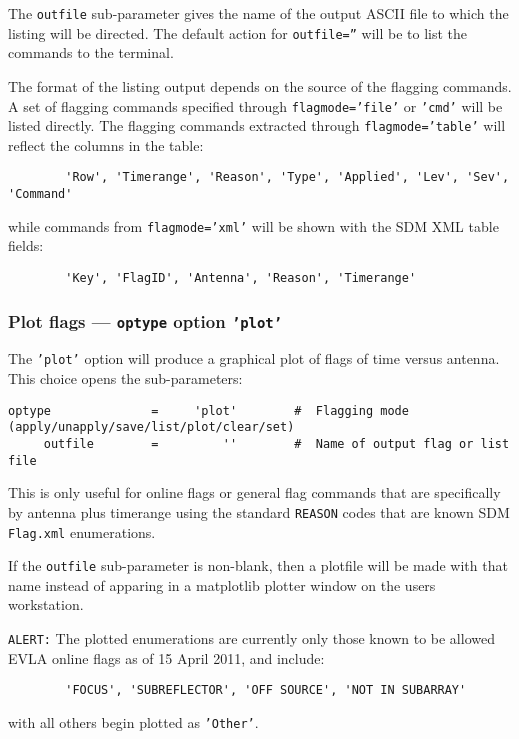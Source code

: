 The {\tt outfile} sub-parameter gives the name of the output ASCII
file to which the listing will be directed.  The default action for
{\tt outfile=''} will be to list the commands to the terminal.

The format of the listing output depends on the source of the flagging
commands. A set of flagging commands specified through 
{\tt flagmode='file'} or {\tt 'cmd'} will be listed directly. The
flagging commands extracted through {\tt flagmode='table'} will
reflect the columns in the table:
\begin{verbatim}
        'Row', 'Timerange', 'Reason', 'Type', 'Applied', 'Lev', 'Sev', 'Command'
\end{verbatim}
while commands from {\tt flagmode='xml'} will be shown with the SDM
XML table fields:
\begin{verbatim}
        'Key', 'FlagID', 'Antenna', 'Reason', 'Timerange'
\end{verbatim}

\subsubsection{Plot flags --- {\tt optype} option {\tt 'plot'}}
\label{section:edit.flagcmd.optype.plot}

The {\tt 'plot'} option will produce a graphical plot of flags of time versus antenna.
This choice opens the sub-parameters:
\small
\begin{verbatim}
optype              =     'plot'        #  Flagging mode (apply/unapply/save/list/plot/clear/set)
     outfile        =         ''        #  Name of output flag or list file
\end{verbatim}
\normalsize
This is only useful for online flags or general flag commands that are
specifically by antenna plus timerange using the standard {\tt REASON}
codes that are known SDM {\tt Flag.xml} enumerations.

If the {\tt outfile} sub-parameter is non-blank, then a plotfile will
be made with that name instead of apparing in a matplotlib plotter window
on the users workstation.

{\tt ALERT:} The plotted enumerations are currently only those known
to be allowed EVLA online flags as of 15 April 2011, and include:
\begin{verbatim}
        'FOCUS', 'SUBREFLECTOR', 'OFF SOURCE', 'NOT IN SUBARRAY'
\end{verbatim}
with all others begin plotted as {\tt 'Other'}.

